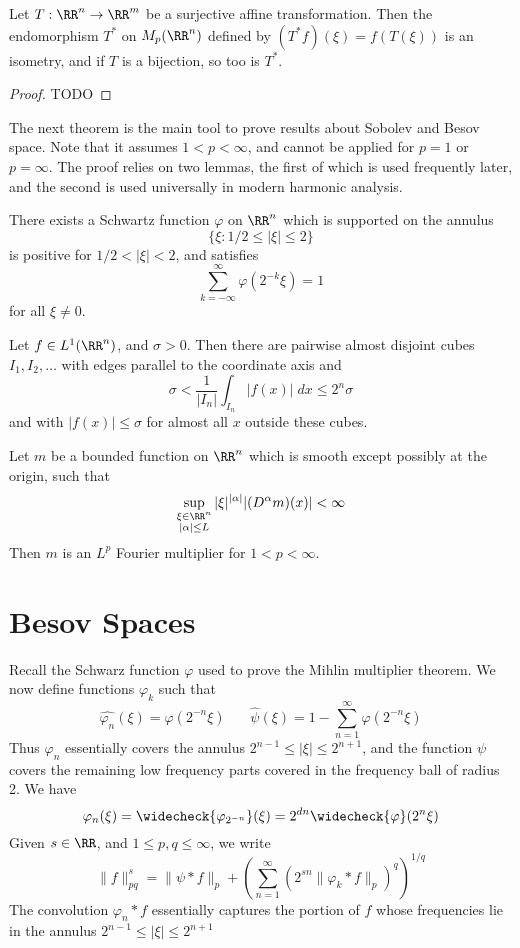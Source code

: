 \begin{theorem}
	Let $T: \RR^n \to \RR^m$ be a surjective affine transformation. Then the endomorphism $T^*$ on $M_p(\RR^n)$ defined by $(T^* f)(\xi) = f(T(\xi))$ is an isometry, and if $T$ is a bijection, so too is $T^*$.
\end{theorem}
\begin{proof}
	TODO
\end{proof}

The next theorem is the main tool to prove results about Sobolev and Besov space. Note that it assumes $1 < p < \infty$, and cannot be applied for $p = 1$ or $p = \infty$. The proof relies on two lemmas, the first of which is used frequently later, and the second is used universally in modern harmonic analysis.

\begin{lemma}
	There exists a Schwartz function $\varphi$ on $\RR^n$ which is supported on the annulus
	\[ \{ \xi: 1/2 \leq |\xi| \leq 2 \} \]
	is positive for $1/2 < |\xi| < 2$, and satisfies
	\[ \sum_{k = -\infty}^\infty \varphi(2^{-k} \xi) = 1 \]
	for all $\xi \neq 0$.
\end{lemma}

\begin{lemma}
	Let $f \in L^1(\RR^n)$, and $\sigma > 0$. Then there are pairwise almost disjoint cubes $I_1, I_2, \dots$ with edges parallel to the coordinate axis and
	\[ \sigma < \frac{1}{|I_n|} \int_{I_n} |f(x)|\; dx \leq 2^n \sigma \]
	and with $|f(x)| \leq \sigma$ for almost all $x$ outside these cubes.
\end{lemma}

\begin{theorem}
	Let $m$ be a bounded function on $\RR^n$ which is smooth except possibly at the origin, such that
	\[ \sup_{\substack{\xi \in \RR^n\\|\alpha| \leq L}} |\xi|^{|\alpha|} |(D^\alpha m)(x)| < \infty \]
	Then $m$ is an $L^p$ Fourier multiplier for $1 < p < \infty$.
\end{theorem}

\section{Besov Spaces}

Recall the Schwarz function $\varphi$ used to prove the Mihlin multiplier theorem. We now define functions $\varphi_k$ such that
%
\[ \widehat{\varphi_n}(\xi) = \varphi(2^{-n} \xi)\ \ \ \ \ \ \ \ \widehat{\psi}(\xi) = 1 - \sum_{n = 1}^\infty \varphi(2^{-n} \xi) \]
%
Thus $\varphi_n$ essentially covers the annulus $2^{n-1} \leq |\xi| \leq 2^{n+1}$, and the function $\psi$ covers the remaining low frequency parts covered in the frequency ball of radius 2. We have
%
\[ \varphi_n(\xi) = \widecheck{\varphi_{2^{-n}}}(\xi) = 2^{dn} \widecheck{\varphi}(2^n \xi) \]
%
Given $s \in \RR$, and $1 \leq p, q \leq \infty$, we write
%
\[ \| f \|_{pq}^s = \| \psi * f \|_p + \left( \sum_{n = 1}^\infty (2^{sn} \| \varphi_k * f \|_p)^q \right)^{1/q} \]
%
The convolution $\varphi_n * f$ essentially captures the portion of $f$ whose frequencies lie in the annulus $2^{n-1} \leq |\xi| \leq 2^{n+1}$

